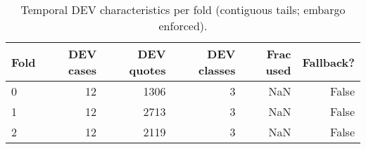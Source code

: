 \begin{table}
\caption{Temporal DEV characteristics per fold (contiguous tails; embargo enforced).}
\label{tab:temporal-integrity}
\begin{tabular}{lrrrrr}
\toprule
Fold & DEV cases & DEV quotes & DEV classes & Frac used & Fallback? \\
\midrule
0 & 12 & 1306 & 3 & NaN & False \\
1 & 12 & 2713 & 3 & NaN & False \\
2 & 12 & 2119 & 3 & NaN & False \\
\bottomrule
\end{tabular}
\end{table}
